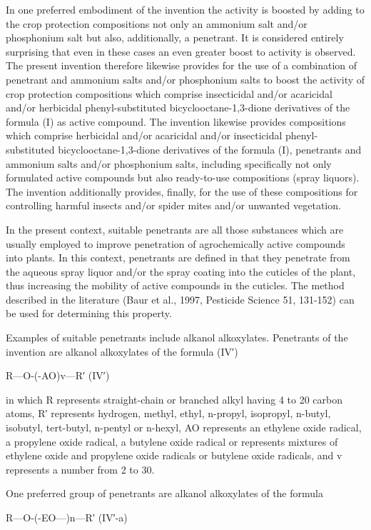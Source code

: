 \documentclass[11pt,a4paper]{article}
\begin{document}
In one preferred embodiment of the invention the activity is boosted by adding to the crop protection compositions not only an ammonium salt and/or phosphonium salt but also, additionally, a penetrant. It is considered entirely surprising that even in these cases an even greater boost to activity is observed. The present invention therefore likewise provides for the use of a combination of penetrant and ammonium salts and/or phosphonium salts to boost the activity of crop protection compositions which comprise insecticidal and/or acaricidal and/or herbicidal phenyl-substituted bicyclooctane-1,3-dione derivatives of the formula (I) as active compound. The invention likewise provides compositions which comprise herbicidal and/or acaricidal and/or insecticidal phenyl-substituted bicyclooctane-1,3-dione derivatives of the formula (I), penetrants and ammonium salts and/or phosphonium salts, including specifically not only formulated active compounds but also ready-to-use compositions (spray liquors). The invention additionally provides, finally, for the use of these compositions for controlling harmful insects and/or spider mites and/or unwanted vegetation.

In the present context, suitable penetrants are all those substances which are usually employed to improve penetration of agrochemically active compounds into plants. In this context, penetrants are defined in that they penetrate from the aqueous spray liquor and/or the spray coating into the cuticles of the plant, thus increasing the mobility of active compounds in the cuticles. The method described in the literature (Baur et al., 1997, Pesticide Science 51, 131-152) can be used for determining this property.

Examples of suitable penetrants include alkanol alkoxylates. Penetrants of the invention are alkanol alkoxylates of the formula (IV′)

R—O-(-AO)v—R′ (IV′)

in which R represents straight-chain or branched alkyl having 4 to 20 carbon atoms, R′ represents hydrogen, methyl, ethyl, n-propyl, isopropyl, n-butyl, isobutyl, tert-butyl, n-pentyl or n-hexyl, AO represents an ethylene oxide radical, a propylene oxide radical, a butylene oxide radical or represents mixtures of ethylene oxide and propylene oxide radicals or butylene oxide radicals, and v represents a number from 2 to 30.

One preferred group of penetrants are alkanol alkoxylates of the formula

R—O-(-EO—)n—R′ (IV′-a)
\end{document}
